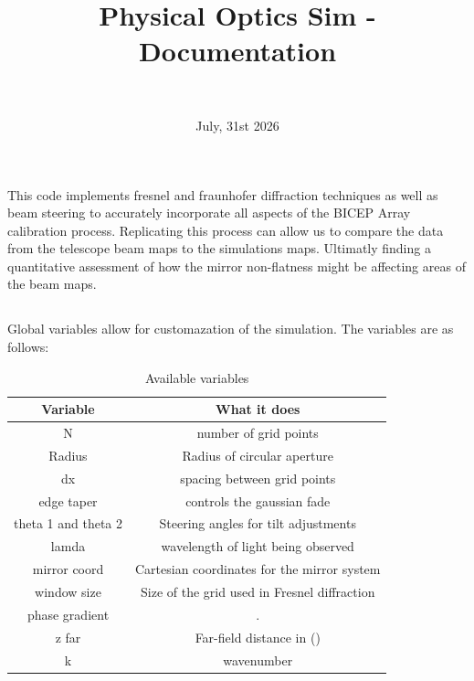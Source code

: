 \documentclass[twoside]{article}
\title{\vspace{-18mm}\fontsize{18pt}{20pt}\selectfont\textbf{Physical Optics Sim - Documentation}}
\author{
\large
\text{Lydia James}\\[2mm]
}
\date{July, 31st 2026}
\begin{document}
\maketitle


\section*{}
This code implements fresnel and fraunhofer diffraction techniques as well as beam steering to accurately incorporate all aspects of the BICEP Array calibration process. Replicating this process can allow us to compare the data from the telescope beam maps to the simulations maps. Ultimatly finding a quantitative assessment of how the mirror non-flatness might be affecting areas of the beam maps. 

\subsection*{}
Global variables allow for customazation of the simulation. The variables are as follows:
\begin{table}[H]
    \begin{center}
        \begin{tabular}{|c|c|}
        \hline
        Variable & What it does\\
        \hline\hline
            N & number of grid points\\
            Radius & Radius of circular aperture \\
            dx & spacing between grid points \\
            edge taper & controls the gaussian fade\\
            theta 1 and theta 2 & Steering angles for tilt adjustments \\
            lamda & wavelength of light being observed\\
            mirror coord &  Cartesian coordinates for the mirror system\\
            window size & Size of the grid used in Fresnel diffraction \\
            phase gradient & . \\
            z far & Far-field distance in () \\
            k & wavenumber\\
        \hline
        \end{tabular}
    \end{center}
    \caption{Available variables}
\end{table}
\end{document}
